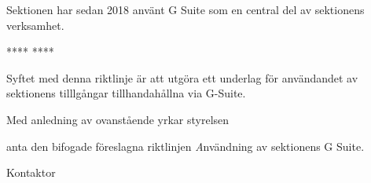 \documentclass[../_main/handlingar.tex]{subfiles}
\begin{document}

Sektionen har sedan 2018 använt G Suite som en central del av sektionens verksamhet. 

****
****


Syftet med denna riktlinje är att utgöra ett underlag för användandet av sektionens tilllgångar tillhandahållna via G-Suite.

Med anledning av ovanstående yrkar styrelsen 

\begin{attsatser}
    \att anta den bifogade föreslagna riktlinjen {\textit Användning av sektionens G Suite}. 


\end{attsatser}

\begin{signatures}{1}
    \ist
    \signature{Mattias Lundström}{Kontaktor}
\end{signatures}
\end{document}
